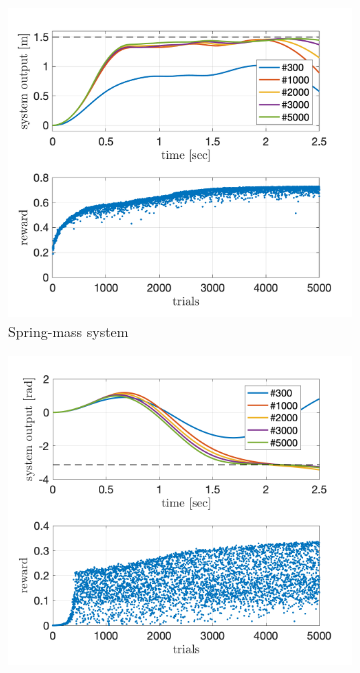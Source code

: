 \documentclass[letterpaper, 10 pt, conference]{ieeeconf}  %
\begin{document}
\begin{figure}[!thp] 
	\centering
	\begin{subfigure}{0.325\textwidth}
	\includegraphics[width=\textwidth]{julia_sdm_quad.png}
	\caption{Spring-mass system \newline}\label{fig:PoWER_sdm}
	\end{subfigure}
	\begin{subfigure}{0.325\textwidth}
	\includegraphics[width=\textwidth]{julia_pend_quad.png}

\end{subfigure}
\end{figure}
\end{document}
